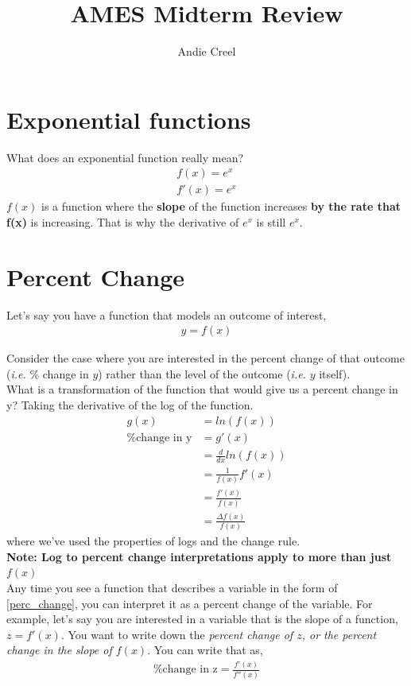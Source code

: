 \documentclass{article}
\title{AMES Midterm Review}
\author{Andie Creel}
\begin{document}
\maketitle

\section{Exponential functions}
What does an exponential function really mean? 
\begin{align}
    f(x) = e^x\\
    f'(x) = e^x
\end{align}
$f(x)$ is a function where the \textbf{slope} of the function increases \textbf{by the rate that f(x)} is increasing. That is why the derivative of $e^x$ is still $e^x$. 

\section{Percent Change}
Let's say you have a function that models an outcome of interest, 
\begin{align}
    y = f(x)
\end{align}

Consider the case where you are interested in the percent change of that outcome (\textit{i.e.} \% change in $y$) rather than the level of the outcome (\textit{i.e.} $y$ itself). \\

What is a transformation of the function that would give us a percent change in y? Taking the derivative of the log of the function. 
\begin{align}
    g(x) &= ln(f(x))\\
    \text{\% change in y} &= g'(x)\\
    &= \frac{d}{dx}  ln(f(x))\\
    &= \frac{1}{f(x)} f'(x) \\
    & = \frac{f'(x)}{f(x)} \label{perc_change}\\
    &= \frac{\Delta f(x)}{f(x)}
\end{align}
where we've used the properties of logs and the change rule. \\

\textbf{Note: Log to percent change interpretations apply to more than just $f(x)$} \\
Any time you see a function that describes a variable in the form of \ref{perc_change}, you can interpret it as a percent change of the variable. For example, let's say you are interested in a variable that is the slope of a function, $z = f'(x)$.  You want to write down the \textit{percent change of $z$, or the percent change in the slope of $f(x)$}. You can write that as, 
\begin{align}	
	\text{\% change in z} = \frac{f'(x)}{f''(x)}
\end{align}
\end{document}
